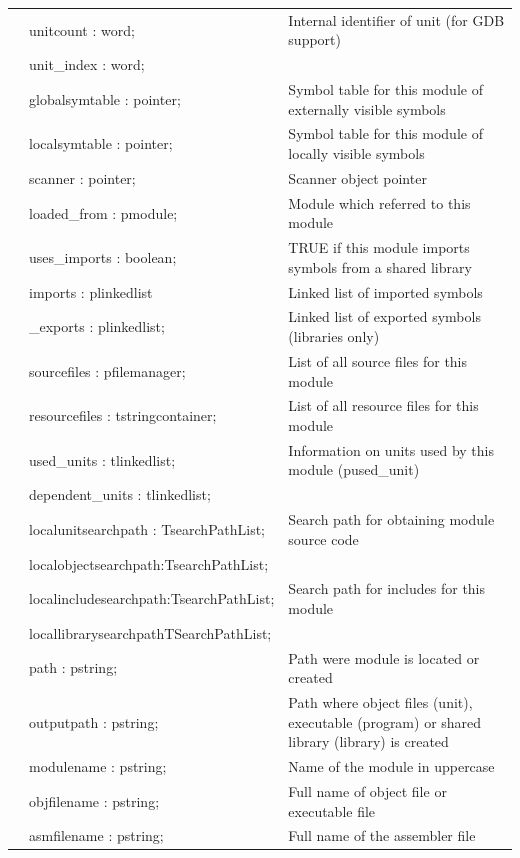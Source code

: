 \documentclass [12pt]{article}
\begin{document}
\begin{longtable}{|l@{\extracolsep{\fill}}lp{7cm}|}
&\textsf{unitcount : word;}		& Internal identifier of unit (for GDB support) \\
&\textsf{unit{\_}index : word;}		&  \\
&\textsf{globalsymtable : pointer;}	& Symbol table for this module of externally visible symbols \\
&\textsf{localsymtable : pointer;}	& Symbol table for this module of locally visible symbols \\
&\textsf{scanner : pointer;}		& Scanner object pointer \\
&\textsf{loaded{\_}from : pmodule;}	& Module which referred to this module \\
&\textsf{uses{\_}imports : boolean;}	& TRUE if this module imports symbols from a shared library \\
&\textsf{imports : plinkedlist}		& Linked list of imported symbols \\
&\textsf{{\_}exports : plinkedlist;}	& Linked list of exported symbols (libraries only) \\
&\textsf{sourcefiles : pfilemanager;}	& List of all source files for this module \\
&\textsf{resourcefiles : tstringcontainer;} & List of all resource files for this module \\
&\textsf{used{\_}units : tlinkedlist; }	& Information on units used by this module (pused{\_}unit) \\
&\textsf{dependent{\_}units : tlinkedlist;}&  \\
&\textsf{localunitsearchpath : TsearchPathList;}& Search path for obtaining module source code \\
&\textsf{localobjectsearchpath:TsearchPathList;}&  \\
&\textsf{localincludesearchpath:TsearchPathList;}& Search path for includes for this module \\
&\textsf{locallibrarysearchpathTSearchPathList;}&  \\
&\textsf{path : pstring;}& Path were module is located or created \\
&\textsf{outputpath : pstring;}& Path where object files (unit), executable (program) or shared library (library) is created \\
&\textsf{modulename : pstring;}& Name of the module in uppercase \\
&\textsf{objfilename : pstring;}& Full name of object file or executable file \\
&\textsf{asmfilename : pstring;}& Full name of the assembler file \\

\end{longtable}
\end{document}
